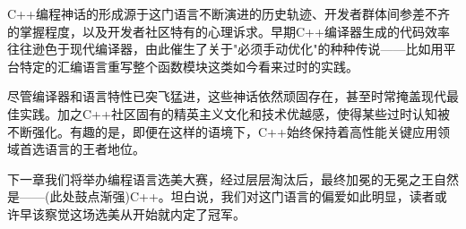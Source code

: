 C++编程神话的形成源于这门语言不断演进的历史轨迹、开发者群体间参差不齐的掌握程度，以及开发者社区特有的心理诉求。早期C++编译器生成的代码效率往往逊色于现代编译器，由此催生了关于"必须手动优化"的种种传说——比如用平台特定的汇编语言重写整个函数模块这类如今看来过时的实践。

尽管编译器和语言特性已突飞猛进，这些神话依然顽固存在，甚至时常掩盖现代最佳实践。加之C++社区固有的精英主义文化和技术优越感，使得某些过时认知被不断强化。有趣的是，即便在这样的语境下，C++始终保持着高性能关键应用领域首选语言的王者地位。

下一章我们将举办编程语言选美大赛，经过层层淘汰后，最终加冕的无冕之王自然是——(此处鼓点渐强)C++。坦白说，我们对这门语言的偏爱如此明显，读者或许早该察觉这场选美从开始就内定了冠军。